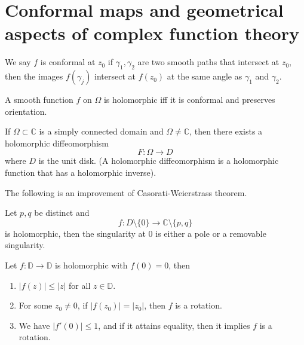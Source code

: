 \documentclass[openany]{book}
\newcommand{\C}{\mathbb{C}}
\begin{document}
\chapter{Conformal maps and geometrical aspects of complex function theory}

\begin{defn}[conformal]
    We say $f$ is conformal at $z_0$ if $\gamma_1, \gamma_2$ are two smooth paths that intersect at $z_0$, then the images $f(\gamma_j)$ intersect at $f(z_0)$ at the same angle as $\gamma_1$ and $\gamma_2$.
\end{defn}


\begin{prop}
    A smooth function $f$ on $\Omega$ is holomorphic iff it is conformal and preserves orientation.
\end{prop}



\begin{thm}
    If $\Omega\subset\C$ is a simply connected domain and $\Omega\neq\C$, then there exists a holomorphic diffeomorphism
    \begin{equation*}
        F:\Omega\to D
    \end{equation*}
    where $D$ is the unit disk. (A holomorphic diffeomorphism is a holomorphic function that has a holomorphic inverse).
\end{thm}
The following is an improvement of Casorati-Weierstrass theorem.
\begin{thm}
    Let $p,q$ be distinct and 
    \begin{equation*}
        f:D\setminus\{0\}\to\C\setminus\{p,q\}
    \end{equation*}    
    is holomorphic, then the singularity at $0$ is either a pole or a removable singularity.
\end{thm}


\begin{prop}
    Let $f:\mathbb{D}\to\mathbb{D}$ is holomorphic with $f(0)=0$, then 
    \begin{enumerate}
        \item $|f(z)|\leq |z|$ for all $z\in\mathbb{D}$.
        \item For some $z_0\neq 0$, if $|f(z_0)|=|z_0|$, then $f$ is a rotation.
        \item We have $|f'(0)|\leq 1$, and if it attains equality, then it implies $f$ is a rotation.
    \end{enumerate}
\end{prop}
\end{document}
